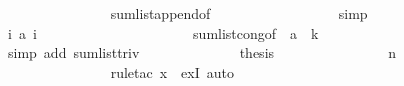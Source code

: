 \begin{isabellebody}
\ \ \ \ \ \ \ \ \ \ \ \ \ \ \isamarkupfalse%
\ sum{\isacharunderscore}list{\isacharunderscore}append{\isacharbrackleft}of\ {\isachardoublequoteopen}{\isacharbrackleft}{}{\isachardot}{\isachardot}{\isacharless}{}{}{}{}{\isacharbrackright}{\isachardoublequoteclose}\ {\isachardoublequoteopen}{\isacharbrackleft}{}{}{}{}{\isachardot}{\isachardot}{\isacharless}{}{}{}{}{\isacharbrackright}{\isachardoublequoteclose}{\isacharbrackright}\isanewline
\ \ \ \ \ \ \ \ \ \ \ \ \ \ \isamarkupfalse%
\ simp\isanewline
\ \ \ \ \ \ \ \ \ \ \ \ \isamarkupfalse%
\ \isamarkupfalse%
\ {\isachardoublequoteopen}{\isacharparenleft}{\isasymSum}i{\isasymleftarrow}{\isacharbrackleft}{}{\isachardot}{\isachardot}{\isacharless}{}{}{}{}{\isacharbrackright}{\isachardot}\ {\isacharquery}a\ i{\isacharparenright}\ {\isacharequal}\ {}{}{}{}\ {\isacharplus}\ {\isacharparenleft}{}\ {\isacharminus}\ {}{\isacharslash}{}{}{}{}{\isacharparenright}{\isachardoublequoteclose}\isanewline
\ \ \ \ \ \ \ \ \ \ \ \ \ \ \isamarkupfalse%
\ sum{\isacharunderscore}list{\isacharunderscore}cong{\isacharbrackleft}of\ {\isachardoublequoteopen}{\isacharbrackleft}{}{\isachardot}{\isachardot}{\isacharless}{}{}{}{}{\isacharbrackright}{\isachardoublequoteclose}\ {\isacharquery}a\ {\isachardoublequoteopen}{\isasymlambda}\ k{\isachardot}\ {}{\isachardoublequoteclose}{\isacharbrackright}\isanewline
\ \ \ \ \ \ \ \ \ \ \ \ \ \ \isamarkupfalse%
\ {\isacharparenleft}simp\ add{\isacharcolon}\ sum{\isacharunderscore}list{\isacharunderscore}triv{\isacharparenright}\isanewline
\ \ \ \ \ \ \ \ \ \ \ \ \isamarkupfalse%
\ {\isacharquery}thesis\isanewline
\ \ \ \ \ \ \ \ \ \ \ \ \ \ \isamarkupfalse%
\ {\isacharbackquoteopen}n\ {\isacharequal}\ {}{}{}{}{\isacharbackquoteclose}\isanewline
\ \ \ \ \ \ \ \ \ \ \ \ \ \ \isamarkupfalse%
\ {\isacharparenleft}rule{\isacharunderscore}tac\ x{\isacharequal}{\isachardoublequoteopen}{}{}{}{}{\isachardoublequoteclose}\ \ exI{\isacharcomma}\ auto{\isacharparenright}\isanewline

\end{isabellebody}
